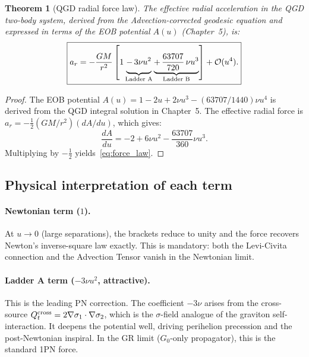 \documentclass[11pt,a4paper]{article}
\theoremstyle{plain}
\newtheorem{theorem}{Theorem}[section]
\theoremstyle{definition}
\theoremstyle{remark}
\begin{document}
\begin{theorem}[QGD radial force law]
\label{thm:force_law}
The effective radial acceleration in the QGD two-body system, derived from the
Advection-corrected geodesic equation and expressed in terms of the EOB potential
$A(u)$ (Chapter~5), is:
\begin{equation}
  \boxed{
  a_r = -\frac{GM}{r^2}
  \left[
    1
    \underbrace{-\,3\nu u^2\vphantom{\frac{X}{X}}}_{\text{Ladder A}}
    \underbrace{+\,\frac{63707}{720}\,\nu u^3}_{\text{Ladder B}}
  \right]
  + \mathcal{O}(u^4).
  }
  \label{eq:force_law}
\end{equation}
\end{theorem}

\begin{proof}
The EOB potential $A(u) = 1 - 2u + 2\nu u^3 - (63707/1440)\nu u^4$ is derived
from the QGD integral solution in Chapter~5.  The effective radial force is
$a_r = -\tfrac{1}{2}(GM/r^2)(dA/du)$, which gives:
\begin{equation}
  \frac{dA}{du} = -2 + 6\nu u^2 - \frac{63707}{360}\nu u^3.
\end{equation}
Multiplying by $-\tfrac{1}{2}$ yields~\eqref{eq:force_law}.  \qquad
\end{proof}

\subsection{Physical interpretation of each term}

\paragraph{Newtonian term ($1$).}
At $u \to 0$ (large separations), the brackets reduce to unity and the force
recovers Newton's inverse-square law exactly.  This is mandatory: both the
Levi-Civita connection and the Advection Tensor vanish in the Newtonian limit.

\paragraph{Ladder A term ($-3\nu u^2$, attractive).}
This is the leading PN correction.  The coefficient $-3\nu$ arises from the
cross-source $Q_t^{\rm cross} = 2\nabla\sigma_1\cdot\nabla\sigma_2$, which is the
$\sigma$-field analogue of the graviton self-interaction.  It deepens the potential
well, driving perihelion precession and the post-Newtonian inspiral.  In the GR
limit ($G_0$-only propagator), this is the standard 1PN force.
\end{document}
